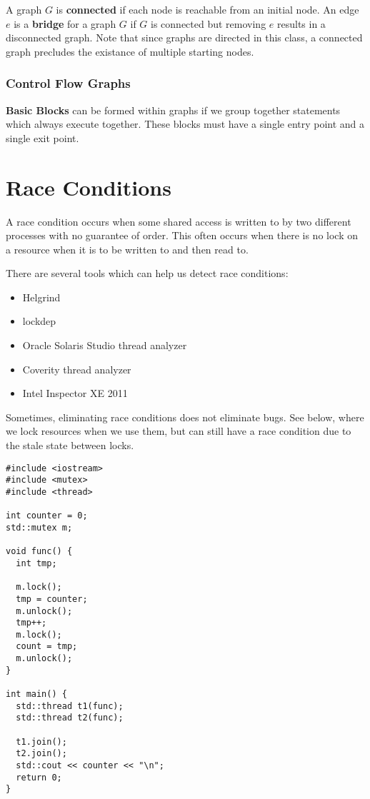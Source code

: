 \documentclass[12pt]{article}
\begin{document}
A graph $G$ is {\bf connected} if each node is reachable from an initial node. An edge $e$ is a {\bf bridge} for a graph $G$ if $G$ is connected but removing $e$ results in a disconnected graph. Note that since graphs are directed in this class, a connected graph precludes the existance of multiple starting nodes.

\subsubsection{Control Flow Graphs}
{\bf Basic Blocks} can be formed within graphs if we group together statements which always execute together. These blocks must have a single entry point and a single exit point.

\section{Race Conditions}
A race condition occurs when some shared access is written to by two different processes with no guarantee of order. This often occurs when there is no lock on a resource when it is to be written to and then read to.

There are several tools which can help us detect race conditions:
\begin{itemize}
\item Helgrind
\item lockdep
\item Oracle Solaris Studio thread analyzer
\item Coverity thread analyzer
\item Intel Inspector XE 2011
\end{itemize}

Sometimes, eliminating race conditions does not eliminate bugs. See below, where we lock resources when we use them, but can still have a race condition due to the stale state between locks.
\begin{verbatim}
#include <iostream>
#include <mutex>
#include <thread>

int counter = 0;
std::mutex m;

void func() {
  int tmp;

  m.lock();
  tmp = counter;
  m.unlock();
  tmp++;
  m.lock();
  count = tmp;
  m.unlock();
}

int main() {
  std::thread t1(func);
  std::thread t2(func);

  t1.join();
  t2.join();
  std::cout << counter << "\n";
  return 0;
}
\end{verbatim}
\end{document}
